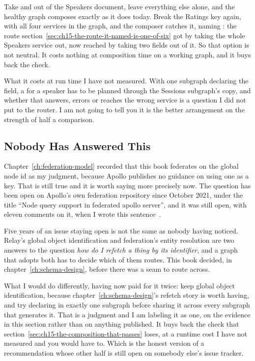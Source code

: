 %
Take  and  out of the Speakers document, leave
everything else alone, and the healthy graph composes exactly as it does today.
Break the Ratings key again, with all four services in the graph, and the
composer catches it, naming
: the route
section~\ref{sec:ch15-the-route-it-named-is-one-of-six} got by taking the whole
Speakers service out, now reached by taking two fields out of it. So that
option is not neutral. It costs nothing at composition time on a working graph,
and it buys back the check.

%
What it costs at run time I have not measured. With one subgraph declaring the
field, a  for a speaker has to be planned through the Sessions
subgraph's copy, and whether that answers, errors or reaches the wrong service
is a question I did not put to the router. I am not going to tell you it is the
better arrangement on the strength of half a comparison.

\subsection{Nobody Has Answered This}

%
Chapter~\ref{ch:federation-model} recorded that this book federates on the
global node id as my judgment, because Apollo publishes no guidance on using
one as a key. That is still true and it is worth saying more precisely now.
The question has been open on Apollo's own federation repository since October
2021, under the title \enquote{Node query support in federated apollo server},
and it was still open, with eleven comments on it, when I wrote this
sentence~\autocite{apollonodeissue}.

%
Five years of an issue staying open is not the same as nobody having noticed.
Relay's global object identification and federation's entity resolution are two
answers to the question \emph{how do I refetch a thing by its identifier}, and
a graph that adopts both has to decide which of them routes. This book decided,
in chapter~\ref{ch:schema-design}, before there was a seam to route across.

%
What I would do differently, having now paid for it twice: keep global object
identification, because chapter~\ref{ch:schema-design}'s refetch story is worth
having, and try declaring  in exactly one subgraph before sharing it
across every subgraph that generates it. That is a judgment and I am labeling
it as one, on the evidence in this section rather than on anything published.
It buys back the check that section~\ref{sec:ch15-the-composition-that-passes}
loses, at a runtime cost I have not measured and you would have to. Which is
the honest version of a recommendation whose other half is still open on
somebody else's issue tracker.
%
